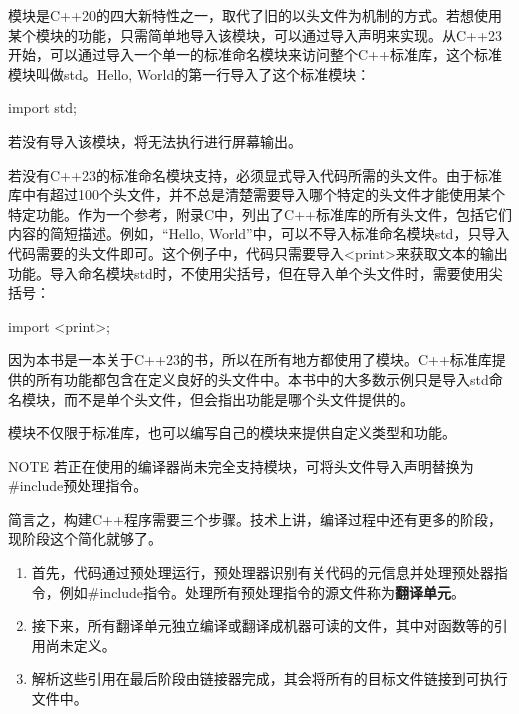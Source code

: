 
模块是C++20的四大新特性之一，取代了旧的以头文件为机制的方式。若想使用某个模块的功能，只需简单地导入该模块，可以通过导入声明来实现。从C++23开始，可以通过导入一个单一的标准命名模块来访问整个C++标准库，这个标准模块叫做std。Hello, World的第一行导入了这个标准模块：

\begin{cpp}
import std;
\end{cpp}

若没有导入该模块，将无法执行进行屏幕输出。

若没有C++23的标准命名模块支持，必须显式导入代码所需的头文件。由于标准库中有超过100个头文件，并不总是清楚需要导入哪个特定的头文件才能使用某个特定功能。作为一个参考，附录C中，列出了C++标准库的所有头文件，包括它们内容的简短描述。例如，“Hello, World”中，可以不导入标准命名模块std，只导入代码需要的头文件即可。这个例子中，代码只需要导入<print>来获取文本的输出功能。导入命名模块std时，不使用尖括号，但在导入单个头文件时，需要使用尖括号：

\begin{cpp}
import <print>;
\end{cpp}

因为本书是一本关于C++23的书，所以在所有地方都使用了模块。C++标准库提供的所有功能都包含在定义良好的头文件中。本书中的大多数示例只是导入std命名模块，而不是单个头文件，但会指出功能是哪个头文件提供的。

模块不仅限于标准库，也可以编写自己的模块来提供自定义类型和功能。

\begin{myNotic}{NOTE}
若正在使用的编译器尚未完全支持模块，可将头文件导入声明替换为\#include预处理指令。
\end{myNotic}


简言之，构建C++程序需要三个步骤。技术上讲，编译过程中还有更多的阶段，现阶段这个简化就够了。

\begin{enumerate}
\item
首先，代码通过预处理运行，预处理器识别有关代码的元信息并处理预处器指令，例如\#include指令。处理所有预处理指令的源文件称为\textbf{翻译单元}。

\item
接下来，所有翻译单元独立编译或翻译成机器可读的文件，其中对函数等的引用尚未定义。

\item
解析这些引用在最后阶段由链接器完成，其会将所有的目标文件链接到可执行文件中。
\end{enumerate}

